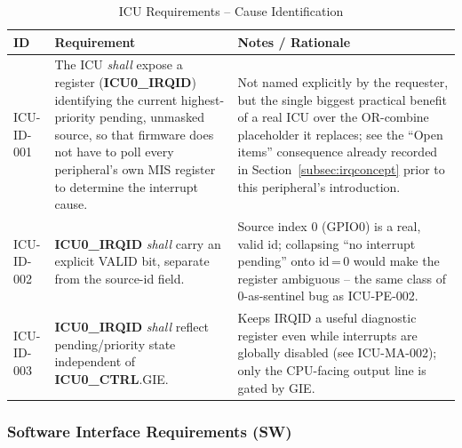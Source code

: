 \begin{table}[H]
\caption{ICU Requirements -- Cause Identification}
\label{tab:asIcuReqID}
\centering
\begin{tabularx}{\textwidth}{|l |X |X|}
  \hline
  ID & Requirement & Notes / Rationale \\
  \hline
  \hline
  ICU-ID-001 &
    The ICU \textit{shall} expose a register (\textbf{ICU0\_IRQID})
    identifying the current highest-priority pending, unmasked source, so
    that firmware does not have to poll every peripheral's own MIS
    register to determine the interrupt cause. &
    Not named explicitly by the requester, but the single biggest
    practical benefit of a real ICU over the OR-combine placeholder it
    replaces; see the ``Open items'' consequence already recorded in
    Section~\ref{subsec:irqconcept} prior to this peripheral's
    introduction. \\
  \hline
  ICU-ID-002 &
    \textbf{ICU0\_IRQID} \textit{shall} carry an explicit VALID bit,
    separate from the source-id field. &
    Source index 0 (GPIO0) is a real, valid id; collapsing ``no interrupt
    pending'' onto id\,=\,0 would make the register ambiguous -- the same
    class of 0-as-sentinel bug as ICU-PE-002. \\
  \hline
  ICU-ID-003 &
    \textbf{ICU0\_IRQID} \textit{shall} reflect pending/priority state
    independent of \textbf{ICU0\_CTRL}.GIE. &
    Keeps IRQID a useful diagnostic register even while interrupts are
    globally disabled (see ICU-MA-002); only the CPU-facing output line
    is gated by GIE. \\
  \hline
\end{tabularx}
\end{table}

\subsubsection{Software Interface Requirements (SW)}

